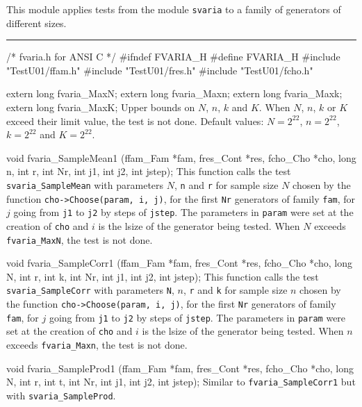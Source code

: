 
This module applies tests from the module {\tt svaria}
to a family of generators of different sizes.

\bigskip
\hrule
\code\hide
/* fvaria.h  for ANSI C */
#ifndef FVARIA_H
#define FVARIA_H
\endhide
#include "TestU01/ffam.h"
#include "TestU01/fres.h"
#include "TestU01/fcho.h"


extern long fvaria_MaxN;
extern long fvaria_Maxn;
extern long fvaria_Maxk;
extern long fvaria_MaxK;
\endcode
\tab
  Upper bounds on $N$, $n$, $k$ and $K$.
  When $N$, $n$, $k$ or $K$ exceed their limit value, the test is not done.
  Default values: $N = 2^{22}$, $n = 2^{22}$, $k = 2^{22}$ and $K = 2^{22}$.
\endtab


\code

void fvaria_SampleMean1 (ffam_Fam *fam, fres_Cont *res, fcho_Cho *cho,
                         long n, int r,
                         int Nr, int j1, int j2, int jstep);
\endcode
\tab  This function calls the test {\tt svaria\_SampleMean} with parameters
  $N$,  {\tt n} and  {\tt r} for sample size $N$ chosen by the function
 {\tt cho->Choose(param, i, j)},
 for the first {\tt Nr} generators of family {\tt fam}, for $j$ going from
 {\tt j1} to {\tt j2} by steps of {\tt jstep}. The parameters in {\tt param}
 were set at the creation of {\tt cho} and $i$ is the lsize of the
 generator being tested.
 When $N$ exceeds {\tt fvaria\_MaxN}, the test is not done.
\endtab
\code


void fvaria_SampleCorr1 (ffam_Fam *fam, fres_Cont *res, fcho_Cho *cho,
                         long N, int r, int k,
                         int Nr, int j1, int j2, int jstep);
\endcode
\tab  This function calls the test {\tt svaria\_SampleCorr} with parameters
 {\tt N}, $n$, {\tt r} and {\tt k} for sample size $n$ chosen by the function
 {\tt cho->Choose(param, i, j)},
 for the first {\tt Nr} generators of family {\tt fam}, for $j$ going from
 {\tt j1} to {\tt j2} by steps of {\tt jstep}. The parameters in {\tt param}
 were set at the creation of {\tt cho} and $i$ is the lsize of the
 generator being tested.
 When $n$ exceeds {\tt fvaria\_Maxn}, the test is not done.
\endtab
\code


void fvaria_SampleProd1 (ffam_Fam *fam, fres_Cont *res, fcho_Cho *cho,
                         long N, int r, int t,
                         int Nr, int j1, int j2, int jstep);
\endcode
\tab Similar to {\tt fvaria\_SampleCorr1} but with {\tt svaria\_SampleProd}.
\endtab
\code


